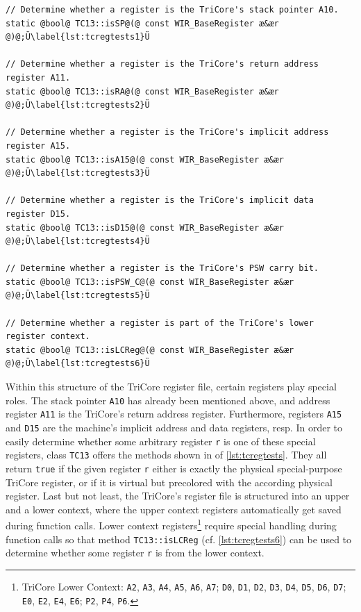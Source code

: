 \begin{lstlisting}[style=code,float=t,caption={Testing of Physical Register Properties of Class \texttt{TC13}},label=lst:tcregtests]
// Determine whether a register is the TriCore's stack pointer A10.
static @bool@ TC13::isSP@(@ const WIR_BaseRegister æ&ær @)@;Ü\label{lst:tcregtests1}Ü

// Determine whether a register is the TriCore's return address register A11.
static @bool@ TC13::isRA@(@ const WIR_BaseRegister æ&ær @)@;Ü\label{lst:tcregtests2}Ü

// Determine whether a register is the TriCore's implicit address register A15.
static @bool@ TC13::isA15@(@ const WIR_BaseRegister æ&ær @)@;Ü\label{lst:tcregtests3}Ü

// Determine whether a register is the TriCore's implicit data register D15.
static @bool@ TC13::isD15@(@ const WIR_BaseRegister æ&ær @)@;Ü\label{lst:tcregtests4}Ü

// Determine whether a register is the TriCore's PSW carry bit.
static @bool@ TC13::isPSW_C@(@ const WIR_BaseRegister æ&ær @)@;Ü\label{lst:tcregtests5}Ü

// Determine whether a register is part of the TriCore's lower register context.
static @bool@ TC13::isLCReg@(@ const WIR_BaseRegister æ&ær @)@;Ü\label{lst:tcregtests6}Ü
\end{lstlisting}

Within this structure of the TriCore register file, certain registers play special roles.
The stack pointer \texttt{A10} has already been mentioned above, and address register \texttt{A11} is the TriCore's return address register.
Furthermore, registers \texttt{A15} and \texttt{D15} are the machine's implicit address and data registers, resp.
In order to easily determine whether some arbitrary register \texttt{r} is one of these special registers, class \texttt{TC13} offers the methods shown in  of \cref{lst:tcregtests}.
They all return \texttt{true} if the given register \texttt{r} either is exactly the physical special-purpose TriCore register, or if it is virtual but precolored with the according physical register.
Last but not least, the TriCore's register file is structured into an upper and a lower context, where the upper context registers automatically get saved during function calls.
Lower context registers\footnote{TriCore Lower Context: \texttt{A2}, \texttt{A3}, \texttt{A4}, \texttt{A5}, \texttt{A6}, \texttt{A7}; \texttt{D0}, \texttt{D1}, \texttt{D2}, \texttt{D3}, \texttt{D4}, \texttt{D5}, \texttt{D6}, \texttt{D7}; \texttt{E0}, \texttt{E2}, \texttt{E4}, \texttt{E6}; \texttt{P2}, \texttt{P4}, \texttt{P6}.} require special handling during function calls so that method \texttt{TC13::isLCReg} (cf. \cref{lst:tcregtests6}) can be used to determine whether some register \texttt{r} is from the lower context.

